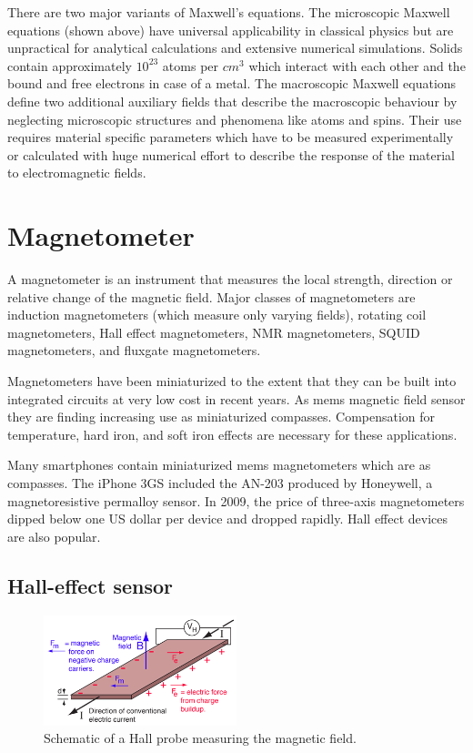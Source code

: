 There are two major variants of Maxwell's equations. The microscopic Maxwell equations (shown above) have universal applicability in classical physics but are unpractical for analytical calculations and extensive numerical simulations. Solids contain approximately $10^{23}$ atoms per $cm^3$ which interact with each other and the bound and free electrons in case of a metal. The macroscopic Maxwell equations define two additional auxiliary fields that describe the macroscopic behaviour by neglecting microscopic structures and phenomena like atoms and spins. Their use requires material specific parameters which have to be measured experimentally or calculated with huge numerical effort to describe the response of the material to electromagnetic fields.

\section{Magnetometer}

A magnetometer is an instrument that measures the local strength, direction or relative change of the magnetic field. Major classes of magnetometers are induction magnetometers (which measure only varying fields), rotating coil magnetometers, Hall effect magnetometers, NMR magnetometers, SQUID magnetometers, and fluxgate magnetometers.

Magnetometers have been miniaturized to the extent that they can be built into integrated circuits at very low cost in recent years. As \gls{mems} magnetic field sensor they are finding increasing use as miniaturized compasses. Compensation for temperature, hard iron, and soft iron effects are necessary for these applications.

Many smartphones contain miniaturized \gls{mems} magnetometers which are as compasses. The iPhone 3GS included the AN-203 produced by Honeywell, a magnetoresistive permalloy sensor.\cite{magnetometer_1} In 2009, the price of three-axis magnetometers dipped below one US dollar per device and dropped rapidly. Hall effect devices are also popular.\cite{magnetometer_2}

\subsection{Hall-effect sensor}

\begin{figure}[h]
    \centering
    \includegraphics[width=0.5\textwidth]{figures/hall_effect.png}
    \caption{Schematic of a Hall probe measuring the magnetic field.}
    \label{fig:hall_effect}
\end{figure}

